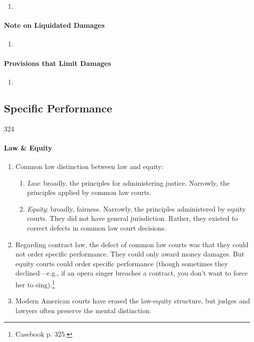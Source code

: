 \begin{enumerate}
    \item %
\end{enumerate}

\paragraph{Note on Liquidated Damages}

\begin{enumerate}
    \item %
\end{enumerate}

\paragraph{Provisions that Limit Damages}

\begin{enumerate}
    \item %
\end{enumerate}

\subsection{Specific Performance} 324

\paragraph{Law \& Equity}

\begin{enumerate}
    \item Common law distinction between law and equity:
    \begin{enumerate}
        \item \emph{Law}: broadly, the principles for administering justice. 
        Narrowly, the principles applied by common law courts.
        \item \emph{Equity}: broadly, fairness. Narrowly, the principles 
        administered by equity courts. They did not have general jurisdiction. 
        Rather, they existed to correct defects in common law court decisions.
    \end{enumerate}
    \item Regarding contract law, the defect of common law courts was that  
    they could not order specific performance. They could only award money 
    damages. But equity courts could order specific performance (though 
    sometimes they declined---e.g., if an opera singer breaches a contract, 
    you don't want to force her to sing).\footnote{Casebook p. 325.}
    \item Modern American courts have erased the law-equity structure, but 
    judges and lawyers often preserve the mental distinction.
\end{enumerate}

